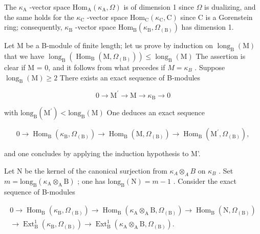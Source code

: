 The \(\kappa_{\mathrm{A}}\) -vector space \(\mathrm{Hom}_{\mathrm{A}}(\kappa_{\mathrm{A}}, \Omega)\) is of dimension 1 since \(\Omega\) is dualizing, and the same holds for the \(\kappa_{\mathrm{C}}\) -vector space \(\mathrm{Hom}_{\mathrm{C}}(\kappa_{\mathrm{C}}, \mathrm{C})\) since C is a Gorenstein ring; consequently, \(\kappa_{\mathrm{B}}\) -vector space \(\mathrm{Hom}_{\mathrm{B}}(\kappa_{\mathrm{B}}, \Omega_{(\mathrm{B})})\) has dimension 1.

Let M be a B-module of finite length; let us prove by induction on \(\operatorname{long}_{\mathrm{B}}(\mathrm{M})\) that we have \(\operatorname{long}_{\mathrm{B}}(\operatorname{Hom}_{\mathrm{B}}(\mathrm{M},\Omega_{(\mathrm{B})})) \leqslant \operatorname{long}_{\mathrm{B}}(\mathrm{M})\) The assertion is clear if M = 0, and it follows from what precedes if \(M = \kappa_{B}\) . Suppose \(\operatorname{long}_{\mathrm{B}}(\mathrm{M}) \geqslant 2\) There exists an exact sequence of B-modules

\[
0 \rightarrow \mathrm{M} ^ {\prime} \rightarrow \mathrm{M} \rightarrow \kappa_ {\mathrm{B}} \rightarrow 0
\]

with \(\mathrm{long}_{\mathrm{B}}(\mathrm{M}^{\prime}) < \mathrm{long}_{\mathrm{B}}(\mathrm{M})\) One deduces an exact sequence

\[
0 \to \operatorname{Hom} _ {\mathrm{B}} (\kappa_ {\mathrm{B}}, \Omega_ {(\mathrm{B})}) \to \operatorname{Hom} _ {\mathrm{B}} (\mathrm{M}, \Omega_ {(\mathrm{B})}) \to \operatorname{Hom} _ {\mathrm{B}} (\mathrm{M} ^ {\prime}, \Omega_ {(\mathrm{B})}),
\]

and one concludes by applying the induction hypothesis to M'.

Let N be the kernel of the canonical surjection from \(\kappa_{A} \otimes_{A} B\) on \(\kappa_{B}\) . Set \(m = \text{long}_{\text{B}}(\kappa_{\text{A}} \otimes_{\text{A}} \text{B})\) ; one has \(\text{long}_{\text{B}}(\text{N}) = m - 1\) . Consider the exact sequence of B-modules

\[
\begin{array}{c} 0 \to \operatorname{Hom} _ {\mathrm{B}} (\kappa_ {\mathrm{B}}, \Omega_ {(\mathrm{B})}) \longrightarrow \operatorname{Hom} _ {\mathrm{B}} (\kappa_ {\mathrm{A}} \otimes_ {\mathrm{A}} \mathrm{B}, \Omega_ {(\mathrm{B})}) \longrightarrow \operatorname{Hom} _ {\mathrm{B}} (\mathrm{N}, \Omega_ {(\mathrm{B})}) \\ \longrightarrow \operatorname{Ext} _ {\mathrm{B}} ^ {1} (\kappa_ {\mathrm{B}}, \Omega_ {(\mathrm{B})}) \longrightarrow \operatorname{Ext} _ {\mathrm{B}} ^ {1} (\kappa_ {\mathrm{A}} \otimes_ {\mathrm{A}} \mathrm{B}, \Omega_ {(\mathrm{B})}). \end{array}
\]

